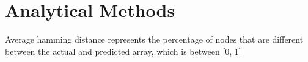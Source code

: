 \section{Analytical Methods} \label{sec:methods}


Average hamming distance represents the percentage of nodes
that are different between the actual and predicted array, which
is between [0, 1]
